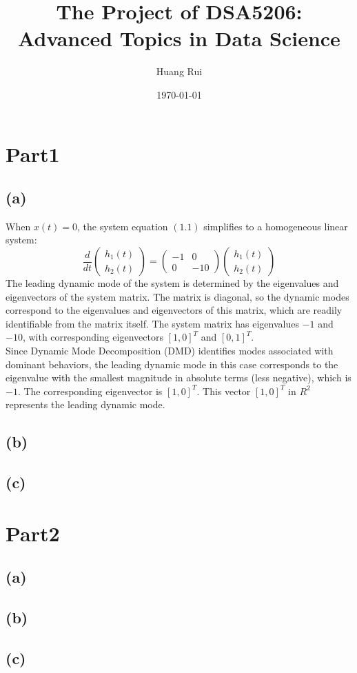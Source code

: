 \documentclass[12pt]{article}
\title{The Project of DSA5206: Advanced Topics in Data Science}
\author{Huang Rui}
\date{\today}
\begin{document}
\maketitle

\section*{Part1}
\subsection*{(a)}
When $x(t)=0$, the system equation $(1.1)$ simplifies to a homogeneous linear system:
\[
\frac{d}{dt}
\begin{pmatrix}
h_1(t) \\
h_2(t)
\end{pmatrix}
=
\begin{pmatrix}
-1 & 0 \\
0 & -10
\end{pmatrix}
\begin{pmatrix}
h_1(t) \\
h_2(t)
\end{pmatrix}
\]
The leading dynamic mode of the system is determined by the eigenvalues and eigenvectors of the system matrix. The matrix is diagonal, so the dynamic modes correspond to the eigenvalues and eigenvectors of this matrix, which are readily identifiable from the matrix itself. The system matrix has eigenvalues $-1$ and $-10$, with corresponding eigenvectors $[1,0]^T$ and $[0,1]^T$.\\

Since Dynamic Mode Decomposition (DMD) identifies modes associated with dominant behaviors, the leading dynamic mode in this case corresponds to the eigenvalue with the smallest magnitude in absolute terms (less negative), which is $-1$. The corresponding eigenvector is $[1,0]^T$. This vector $[1,0]^T$ in $R^2 $ represents the leading dynamic mode.\\

\subsection*{(b)}








\subsection*{(c)}



\section*{Part2}
\subsection*{(a)}


\subsection*{(b)}

\subsection*{(c)}
\end{document}
